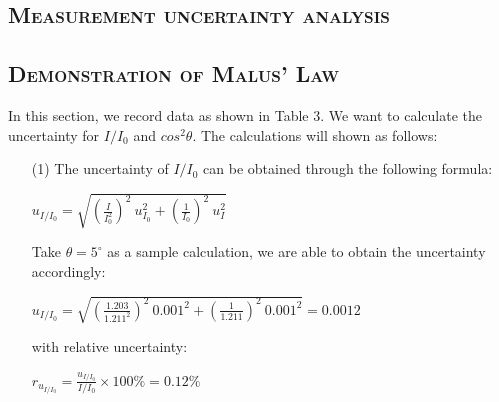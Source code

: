 \documentclass[a4paper,12pt]{article}
\begin{document}
\begin{appendices} 
\section{\textsc{Measurement uncertainty analysis}} 
	\subsection{\textsc{Demonstration of Malus’ Law}}
	In this section, we record data as shown in Table 3. We want to calculate the uncertainty for $I/I_0$ and $cos^2\theta$. The calculations will shown as follows:
	\begin{itemize}
	\item[(1)] The uncertainty of $I/I_0$ can be obtained through the following formula:
	\begin{center}
	$\displaystyle u_{I/I_0} = \sqrt{(\frac{I}{I_0^2})^2~u_{I_0}^2 + (\frac{1}{I_0})^2 ~ u_I^2}  $
	\end{center}
	Take $\theta = 5^{\circ}$ as a sample calculation, we are able to obtain the uncertainty accordingly:
	\begin{center}
	$\displaystyle u_{I/I_0} = \sqrt{(\frac{1.203}{1.211^2})^2~0.001^2 + (\frac{1}{1.211})^2 ~ 0.001^2} = 0.0012 $
	\end{center}
	with relative uncertainty:
	\begin{center}
	$ \displaystyle r_{u_{I/I_0}} =\frac{u_{I/I_0}}{I/I_0} \times 100\% = 0.12\% $
	\end{center}
	

\end{itemize}
\end{appendices}
\end{document}
